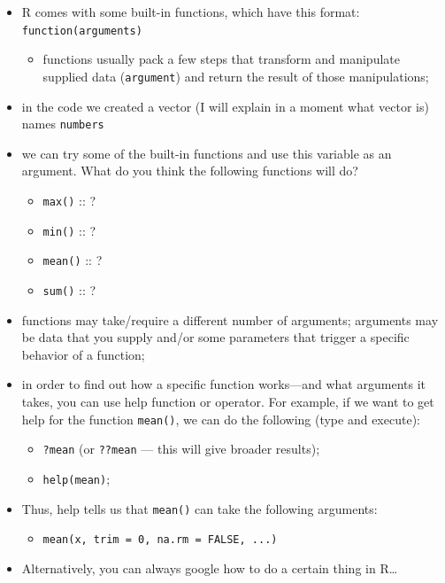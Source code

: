 \documentclass[
]{book}
\providecommand{\tightlist}{%
  \setlength{\itemsep}{0pt}\setlength{\parskip}{0pt}}
\begin{document}
\begin{itemize}
\tightlist
\item
  R comes with some built-in functions, which have this format: \texttt{function(arguments)}

  \begin{itemize}
  \tightlist
  \item
    functions usually pack a few steps that transform and manipulate supplied data (\texttt{argument}) and return the result of those manipulations;
  \end{itemize}
\item
  in the code we created a vector (I will explain in a moment what vector is) names \texttt{numbers}
\item
  we can try some of the built-in functions and use this variable as an argument. What do you think the following functions will do?

  \begin{itemize}
  \tightlist
  \item
    \texttt{max()} :: ?
  \item
    \texttt{min()} :: ?
  \item
    \texttt{mean()} :: ?
  \item
    \texttt{sum()} :: ?
  \end{itemize}
\item
  functions may take/require a different number of arguments; arguments may be data that you supply and/or some parameters that trigger a specific behavior of a function;
\item
  in order to find out how a specific function works---and what arguments it takes, you can use help function or operator. For example, if we want to get help for the function \texttt{mean()}, we can do the following (type and execute):

  \begin{itemize}
  \tightlist
  \item
    \texttt{?mean} (or \texttt{??mean} --- this will give broader results);
  \item
    \texttt{help(mean)};
  \end{itemize}
\item
  Thus, help tells us that \texttt{mean()} can take the following arguments:

  \begin{itemize}
  \tightlist
  \item
    \texttt{mean(x,\ trim\ =\ 0,\ na.rm\ =\ FALSE,\ ...)}
  \end{itemize}
\item
  Alternatively, you can always google how to do a certain thing in R\ldots{}
\end{itemize}
\end{document}
